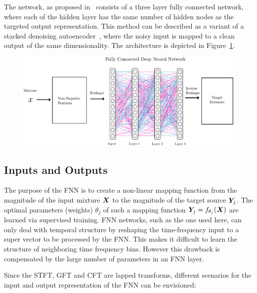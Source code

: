 \par
The network, as proposed in~\cite{uhlich15} consists of a three layer fully connected network, where each of the hidden layer has the same number of hidden nodes as the targeted output representation.
This method can be described as a variant of a stacked denoising autoencoder~\cite{pvincent08}, where the noisy input is mapped to a clean output of the same dimensionality.
The architecture is depicted in Figure~\ref{fig:cft_dnn}. 

\begin{figure}[ht!]
\centering
		\includegraphics[width=\textwidth]{Chapters/06_Separation_Unknown/figures/uhlich_dnn.pdf}
\caption{}
\label{fig:cft_dnn}
\end{figure}

\subsection{Inputs and Outputs}

The purpose of the FNN is to create a non-linear mapping function from the magnitude of the input mixture \({\bm{X}}\) to the magnitude of the target source \({\bm{Y}}_j\).
The optimal parameters (weights) \(\theta_j\) of such a mapping function \({\bm{Y}}_j = f_{\theta_j}({\bm{X}})\) are learned via supervised training.
FNN networks, such as the one used here, can only deal with temporal structure by reshaping the time-frequency input to a super vector to be processed by the FNN.
This makes it difficult to learn the structure of neighboring time frequency bins. 
However this drawback is compensated by the large number of parameters in an FNN layer.

Since the STFT, GFT and CFT are lapped transforms, different scenarios for the input and output representation of the FNN can be envisioned:

